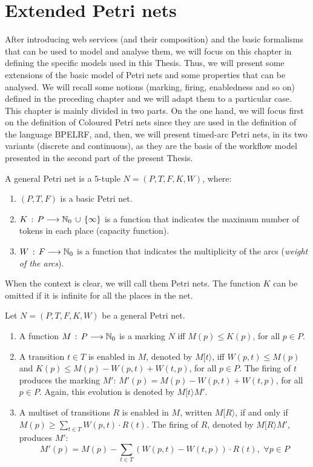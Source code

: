 \chapter{Extended Petri nets}\label{chapter:c3}
After introducing web services (and their composition) and the basic formalisms
that can be used to model and analyse them, we will focus on this chapter in defining the specific models used in this Thesis. Thus, we
will present some extensions of the basic model of Petri nets and some properties
that can be analysed. We will recall some notions (marking, firing, enabledness and so on) defined in the preceding chapter
and we will adapt them to a particular case. This chapter is mainly divided in two parts. On the one hand,
we will focus first on the definition of Coloured Petri nets since they are used in the definition of the language BPELRF, and, then,
we will present timed-arc Petri nets, in its two variants (discrete and continuous), as they are the basis of the workflow model presented in the
second part of the present Thesis.

\begin{definition} 
A general Petri net is a 5-tuple $N=(P,T,F,K,W)$, where:
\begin{enumerate}
\item $(P,T,F)$ is a basic Petri net.
\item $K\,:\,P \longrightarrow \mathbb{N}_{0} \,\cup\, \{\infty\}$ is a function that
indicates the maximum number of tokens in each place (capacity function).
\item $W\,:\,F \longrightarrow \mathbb{N}_{0}$ is a function that indicates
the multiplicity of the arcs ({\it weight of the arcs}).
\end{enumerate}
When the context is clear, we will call them Petri nets. The function $K$
can be omitted if it is infinite for all the places in the net.
\end{definition}

\begin{definition} 
Let $N=(P,T,F,K,W)$ be a general Petri net.
\begin{enumerate}
\item A function $M\,:\, P \longrightarrow \mathbb{N}_{0}$ is a marking
$N$ iff $M(p) \leq K(p)$, for all
$p \in P$.
\item A transition $t \in T$ is enabled in $M$, denoted by $M[ t \rangle$,
iff $W(p,t) \leq M(p)$ and  $K(p) \leq M(p)-W(p,t)+W(t,p)$, for all $p \in P$.
The firing of $t$ produces the marking $M'$:
$M'(p) = M(p) - W(p,t) + W(t,p)$, for all $p \in P$.
Again, this evolution is denoted by $M[ t \rangle M'$.
\item A multiset of transitions $R$ is enabled in $M$, written $M [ R \rangle$, if and only if
$M(p) \geq \sum_{t \in T} W(p,t) \cdot R(t)$. The firing of $R$,  denoted by $M [ R \rangle M'$,
produces $M'$:
\[ M'(p) = M(p) - \sum_{t \in T} (W(p,t) - W(t,p)) \cdot R(t), \,\,
\forall p \in P\]
\end{enumerate}
\end{definition}

